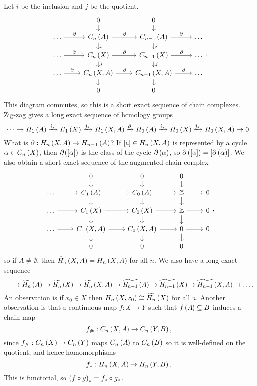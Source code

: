 Let $ i $ be the inclusion and $ j $ be the quotient.
$$
\begin{tikzcd}[row sep=small]
& 0 \arrow{d} & 0 \arrow{d} & \\
\dots \arrow{r}{\partial} & C_n\rb{A} \arrow{r}{\partial} \arrow{d}{i} & C_{n - 1}\rb{A} \arrow{r}{\partial} \arrow{d}{i} & \dots \\
\dots \arrow{r}{\partial} & C_n\rb{X} \arrow{r}{\partial} \arrow{d}{j} & C_{n - 1}\rb{X} \arrow{r}{\partial} \arrow{d}{j} & \dots \\
\dots \arrow{r}{\partial} & C_n\rb{X, A} \arrow{r}{\partial} \arrow{d} & C_{n - 1}\rb{X, A} \arrow{r}{\partial} \arrow{d} & \dots \\
& 0 & 0 &
\end{tikzcd}.
$$
This diagram commutes, so this is a short exact sequence of chain complexes. Zig-zag gives a long exact sequence of homology groups
$$ \dots \to H_1\left( A \right) \xrightarrow{i_*} H_1\left( X \right) \xrightarrow{j_*} H_1\left( X, A \right) \xrightarrow{\partial} H_0\left( A \right) \xrightarrow{i_*} H_0\left( X \right) \xrightarrow{j_*} H_0\left( X, A \right) \to 0. $$
What is $ \partial : H_n\left( X, A \right) \to H_{n - 1}\left( A \right) $? If $ \left[ a \right] \in H_n\left( X, A \right) $ is represented by a cycle $ \alpha \in C_n\left( X \right) $, then $ \partial\left( \left[ \alpha \right] \right) $ is the class of the cycle $ \partial\left( \alpha \right) $, so $ \partial\left( \left[ \alpha \right] \right) = \left[ \partial\left( \alpha \right) \right] $. We also obtain a short exact sequence of the augmented chain complex
$$
\begin{tikzcd}[row sep=small]
& 0 \arrow{d} & 0 \arrow{d} & 0 \arrow{d} & \\
\dots \arrow{r} & C_1\rb{A} \arrow{r} \arrow{d} & C_0\rb{A} \arrow{r} \arrow{d} & \Z \arrow{r} \arrow{d} & 0 \\
\dots \arrow{r} & C_1\rb{X} \arrow{r} \arrow{d} & C_0\rb{X} \arrow{r} \arrow{d} & \Z \arrow{r} \arrow{d} & 0 \\
\dots \arrow{r} & C_1\rb{X, A} \arrow{r} \arrow{d} & C_0\rb{X, A} \arrow{r} \arrow{d} & 0 \arrow{r} \arrow{d} & 0 \\
& 0 & 0 & 0 &
\end{tikzcd},
$$
so if $ A \ne \emptyset $, then $ \widetilde{H_n}\left( X, A \right) = H_n\left( X, A \right) $ for all $ n $. We also have a long exact sequence
$$ \dots \to \widetilde{H_n}\left( A \right) \to \widetilde{H_n}\left( X \right) \to \widetilde{H_n}\left( X, A \right) \to \widetilde{H_{n - 1}}\left( A \right) \to \widetilde{H_{n - 1}}\left( X \right) \to \widetilde{H_{n - 1}}\left( X, A \right) \to \dots. $$
An observation is if $ x_0 \in X $ then $ H_n\left( X, x_0 \right) \cong \widetilde{H_n}\left( X \right) $ for all $ n $. Another observation is that a continuous map $ f : X \to Y $ such that $ f\left( A \right) \subseteq B $ induces a chain map
$$ f_\# : C_n\left( X, A \right) \to C_n\left( Y, B \right), $$
since $ f_\# : C_n\left( X \right) \to C_n\left( Y \right) $ maps $ C_n\left( A \right) $ to $ C_n\left( B \right) $ so it is well-defined on the quotient, and hence homomorphisms
$$ f_* : H_n\left( X, A \right) \to H_n\left( Y, B \right). $$
This is functorial, so $ \left( f \circ g \right)_* = f_* \circ g_* $.

